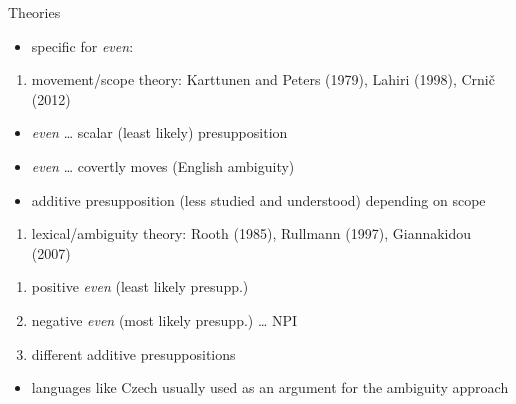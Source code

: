 \documentclass[ignorenonframetext,]{beamer}
\providecommand{\tightlist}{%
  \setlength{\itemsep}{0pt}\setlength{\parskip}{0pt}}
\begin{document}
\begin{frame}{Theories}

\begin{itemize}
\tightlist
\item
  specific for \emph{even}:
\end{itemize}

\begin{enumerate}
\def\labelenumi{\arabic{enumi})}
\tightlist
\item
  movement/scope theory: Karttunen and Peters (1979), Lahiri (1998),
  Crnič (2012)
\end{enumerate}

\begin{itemize}
\tightlist
\item
  \emph{even} \ldots{} scalar (least likely) presupposition
\item
  \emph{even} \ldots{} covertly moves (English ambiguity)
\item
  additive presupposition (less studied and understood) depending on
  scope
\end{itemize}

\end{frame}

\begin{frame}

\begin{enumerate}
\def\labelenumi{\arabic{enumi})}
\setcounter{enumi}{1}
\tightlist
\item
  lexical/ambiguity theory: Rooth (1985), Rullmann (1997), Giannakidou
  (2007)
\end{enumerate}

\begin{enumerate}
\def\labelenumi{\alph{enumi})}
\tightlist
\item
  positive \emph{even} (least likely presupp.)
\item
  negative \emph{even} (most likely presupp.) \ldots{} NPI
\item
  different additive presuppositions
\end{enumerate}

\begin{itemize}
\tightlist
\item
  languages like Czech usually used as an argument for the ambiguity
  approach
\end{itemize}

\end{frame}
\end{document}
